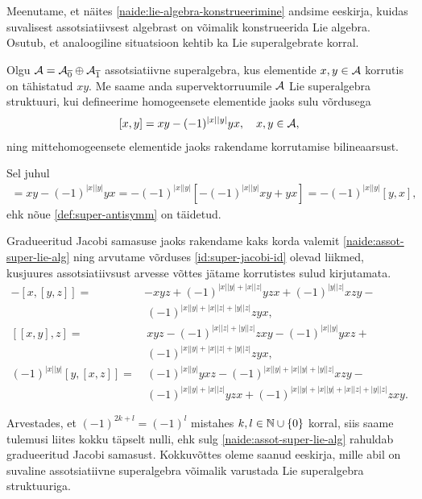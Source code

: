 Meenutame, et näites \ref{naide:lie-algebra-konstrueerimine} andsime eeskirja,
kuidas suvalisest assotsiatiivsest algebrast on võimalik konstrueerida
Lie algebra. Osutub, et analoogiline situatsioon kehtib ka Lie superalgebrate
korral.

\begin{naide}
    Olgu $\mathcal{A} = \mathcal{A}_{\overline{0}} \oplus \mathcal{A}_{\overline{1}}$ assotsiatiivne
    superalgebra, kus elementide $x, y \in \mathcal{A}$ korrutis on tähistatud $xy$.
    Me saame anda supervektorruumile $\mathcal{A}$ Lie superalgebra struktuuri,
    kui defineerime homogeensete elementide jaoks sulu võrdusega
    \begin{align}\label{naide:assot-super-lie-alg}
        [x, y] = xy - (-1)^{|x||y|} yx, \quad x, y \in \mathcal{A},
    \end{align}
    ning mittehomogeensete elementide jaoks rakendame korrutamise
    bilineaarsust.

    Sel juhul
    \begin{align*}
        [x, y] =
        xy - (-1)^{|x||y|} yx =
        -(-1)^{|x||y|} \left[
            -(-1)^{|x||y|}xy + yx
        \right] =
        -(-1)^{|x||y|} [y, x],
    \end{align*}
    ehk nõue \eqref{def:super-antisymm} on täidetud.

    Gradueeritud Jacobi samasuse jaoks rakendame kaks korda valemit
    \eqref{naide:assot-super-lie-alg} ning arvutame võrduses
    \eqref{id:super-jacobi-id} olevad liikmed, kusjuures assotsiatiivsust
    arvesse võttes jätame korrutistes sulud kirjutamata.
    \begin{align*}
        -[x, [y, z]] =& -xyz + (-1)^{|x||y| + |x||z|} yzx +
            (-1)^{|y||z|} xzy - \\
            &\ (-1)^{|x||y| + |x||z| + |y||z|} zyx, \\[0.25cm]
        [[x, y], z] =&\ xyz - (-1)^{|x||z| + |y||z|} zxy -
            (-1)^{|x||y|} yxz + \\
            &\ (-1)^{|x||y| + |x||z| + |y||z|} zyx, \\[0.25cm]
        (-1)^{|x||y|}[y, [x, z]] =&\ (-1)^{|x||y|} yxz -
            (-1)^{|x||y| + |x||y| + |y||z|} xzy - \\
            &\ (-1)^{|x||y| + |x||z|} yzx +
            (-1)^{|x||y| + |x||y| + |x||z| + |y||z|} zxy.
    \end{align*}

    Arvestades, et $(-1)^{2k + l} = (-1)^{l}$ mistahes
    $k, l \in \mathbb{N} \cup \{0\}$ korral, siis saame tulemusi liites kokku
    täpselt nulli, ehk sulg \eqref{naide:assot-super-lie-alg} rahuldab
    gradueeritud Jacobi samasust. Kokkuvõttes oleme saanud eeskirja, mille
    abil on suvaline assotsiatiivne superalgebra võimalik varustada
    Lie superalgebra struktuuriga.
\end{naide}

